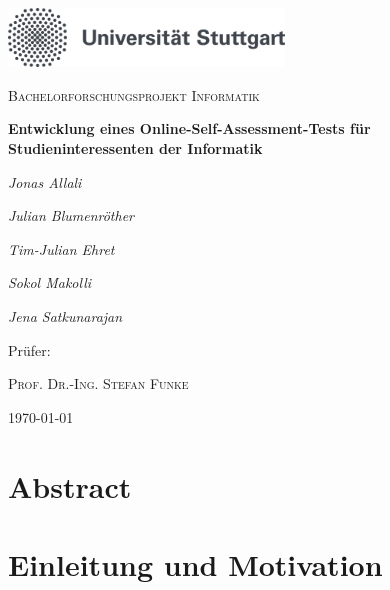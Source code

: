 \documentclass[a4paper,12pt,headsepline]{scrartcl}
\begin{document}
	
\newpage
\thispagestyle{empty} %
\section*{ }

\begin{titlepage}
		\centering
		\includegraphics[width=0.55\textwidth]{unistuttgart_logo_deutsch}\par\vspace{1cm}
		{\scshape\Large Bachelorforschungsprojekt Informatik\par}
		\vspace{1.5cm}
		{\huge\bfseries Entwicklung eines
			Online-Self-Assessment-Tests für
			Studieninteressenten der Informatik\par}
		\vspace{2cm}
		{\Large\itshape Jonas Allali\par}
		\vspace{0.2cm}
		{\Large\itshape Julian Blumenröther\par}
		\vspace{0.2cm}
		{\Large\itshape Tim-Julian Ehret\par}
		\vspace{0.2cm}
		{\Large\itshape Sokol Makolli\par}
		\vspace{0.2cm}
		{\Large\itshape Jena Satkunarajan\par}
		\vspace{1cm}
		{\Large Prüfer: \par
			\vspace{0.3cm}
		\textsc{Prof. Dr.-Ing. Stefan Funke}}
		
		\vfill
		
		{\large \today\par}
\end{titlepage}	

\tableofcontents
\newpage

\section{Abstract}

\section{Einleitung und Motivation}
\end{document}
